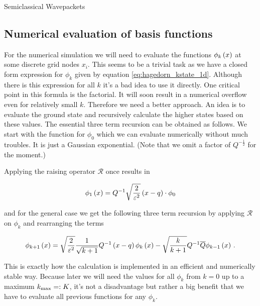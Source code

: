 \begin{chapter}{Semiclassical Wavepackets}
\subsection{Numerical evaluation of basis functions}

For the numerical simulation we will need to evaluate the functions $\phi_k\left( x \right)$
at some discrete grid nodes $x_i$. This seems to be a trivial task as we have a
closed form expression for $\phi_k$ given by equation \eqref{eq:hagedorn_kstate_1d}.
Although there is this expression for all $k$ it's a bad idea to use it directly.
One critical point in this formula is the factorial. It will soon result in a
numerical overflow even for relatively small $k$. Therefore we need a better approach.
An idea is to evaluate the ground state and recursively calculate the higher states
based on these values. The essential three term recursion can be obtained as follows.
We start with the function for $\phi_0$ which we can evaluate numerically without
much troubles. It is just a Gaussian exponential. (Note that we omit a factor of
$Q^{-\frac{1}{2}}$ for the moment.)

Applying the raising operator $\mathcal{R}$ once results in

\begin{equation}
  \phi_1\left( x \right) = Q^{-1} \sqrt{\frac{2}{\varepsilon^2}}\left(x-q\right) \cdot \phi_0
\end{equation}

and for the general case we get the following three term recursion by applying
$\mathcal{R}$ on $\phi_k$ and rearranging the terms

\begin{equation} \label{eq:hagedorn_recursion_rel}
  \phi_{k+1}\left( x \right) = \sqrt{\frac{2}{\varepsilon^2}} \frac{1}{\sqrt{k+1}} Q^{-1}
                      \left(x-q\right) \phi_k\left( x \right)
                      - \sqrt{\frac{k}{k+1}} Q^{-1} \overline{Q} \phi_{k-1} \left( x \right) \,.
\end{equation}

This is exactly how the calculation is implemented in an efficient and numerically
stable way. Because later we will need the values for all $\phi_k$ from $k=0$
up to a maximum $k_{\text{max}}=: K$, it's not a disadvantage but rather a big benefit
that we have to evaluate all previous functions for any $\phi_k$.


\end{chapter}

